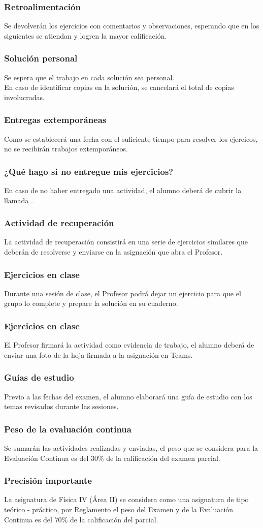 \documentclass[14pt]{beamer}
\begin{document}
\begin{frame}
\frametitle{Retroalimentación}
Se devolverán los ejercicios con comentarios y observaciones, esperando que en los siguientes se atiendan y logren la mayor calificación.
\end{frame}
\begin{frame}
\frametitle{Solución personal}
Se espera que el trabajo en cada solución sea personal.
\\
\bigskip
\pause
En caso de identificar copias en la solución, se cancelará el total de copias involucradas.
\end{frame}
\begin{frame}
\frametitle{Entregas extemporáneas}
Como se establecerá una fecha con el suficiente tiempo para resolver los ejercicos, no se recibirán trabajos extemporáneos.
\end{frame}
\begin{frame}
\frametitle{¿Qué hago si no entregue mis ejercicios?}
En caso de no haber entregado una actividad, el alumno deberá de cubrir la llamada .
\end{frame}
\begin{frame}
\frametitle{Actividad de recuperación}
La actividad de recuperación consistirá en una serie de ejercicios similares que deberán de resolverse y enviarse en la asignación que abra el Profesor.
\end{frame}
\begin{frame}
\frametitle{Ejercicios en clase}
Durante una sesión de clase, el Profesor podrá dejar un ejercicio para que el grupo lo complete y prepare la solución en su cuaderno.
\end{frame}
\begin{frame}
\frametitle{Ejercicios en clase}
El Profesor firmará la actividad como evidencia de trabajo, \pause el alumno deberá de enviar una foto de la hoja firmada a la asignación en Teams.
\end{frame}
\begin{frame}
\frametitle{Guías de estudio}
Previo a las fechas del examen, el alumno elaborará una guía de estudio con los temas revisados durante las sesiones.
\end{frame}
\begin{frame}
\frametitle{Peso de la evaluación continua}
Se sumarán las actividades realizadas y enviadas, el peso que se considera para la Evaluación Continua es del $30\%$ de la calificación del examen parcial.
\end{frame}
\begin{frame}
\frametitle{Precisión importante}
La asignatura de Física IV (Área II) se considera como una asignatura de tipo teórico - práctico, \pause por Reglamento el peso del Examen y de la Evaluación Continua es del $70\%$ de la calificación del parcial.
\end{frame}
\end{document}
